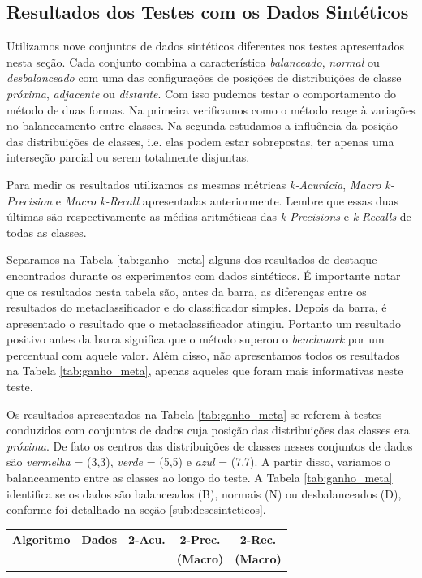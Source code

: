 {\newpage
\subsection{Resultados dos Testes com os Dados Sintéticos}

Utilizamos nove conjuntos de dados sintéticos diferentes nos testes apresentados nesta seção.
Cada conjunto combina a característica \textit{balanceado}, \textit{normal} ou \textit{ desbalanceado} com uma das configurações de posições de distribuições de classe \textit{próxima}, \textit{adjacente} ou \textit{distante}.
Com isso pudemos testar o comportamento do método de duas formas.
Na primeira verificamos como o método reage à variações no balanceamento entre classes.
Na segunda estudamos a influência da posição das distribuições de classes, i.e. elas podem estar sobrepostas, ter apenas uma interseção parcial ou serem totalmente disjuntas.

Para medir os resultados utilizamos as mesmas métricas \textit{k-Acurácia}, \textit{Macro k-Precision} e \textit{Macro k-Recall} apresentadas anteriormente.
Lembre que essas duas últimas são respectivamente as médias aritméticas das \textit{k-Precisions} e \textit{k-Recalls} de todas as classes.

Separamos na Tabela \ref{tab:ganho_meta} alguns dos resultados de destaque encontrados durante os experimentos com dados sintéticos.
É importante notar que os resultados nesta tabela são, antes da barra, as diferenças entre os resultados do metaclassificador e do classificador simples.
Depois da barra, é apresentado o resultado que o metaclassificador atingiu.
Portanto um resultado positivo antes da barra significa que o método superou o \textit{benchmark} por um percentual com aquele valor.
Além disso, não apresentamos todos os resultados na Tabela \ref{tab:ganho_meta}, apenas aqueles que foram mais informativas neste teste.

Os resultados apresentados na Tabela \ref{tab:ganho_meta} se referem à testes conduzidos com conjuntos de dados cuja posição das distribuições das classes era \textit{próxima}.
De fato os centros das distribuições de classes nesses conjuntos de dados são \textit{vermelha} = (3,3), \textit{verde} = (5,5) e \textit{azul} = (7,7).
A partir disso, variamos o balanceamento entre as classes ao longo do teste.
A Tabela \ref{tab:ganho_meta} identifica se os dados são balanceados (B), normais (N) ou desbalanceados (D), conforme foi detalhado na seção \ref{sub:descsinteticos}.

\begin{table}[h!]
  \begin{center}
   \resizebox{\textwidth}{!} {
   \begin{tabular}{ccccc}
      \hline
      \textbf{Algoritmo} & \textbf{Dados} &  \textbf{2-Acu.} & \textbf{2-Prec.} & \textbf{2-Rec.} \\
          &     &    & \textbf{(Macro)} & \textbf{(Macro)} \\
      \hline


\end{tabular}}
\end{center}
\end{table}}
